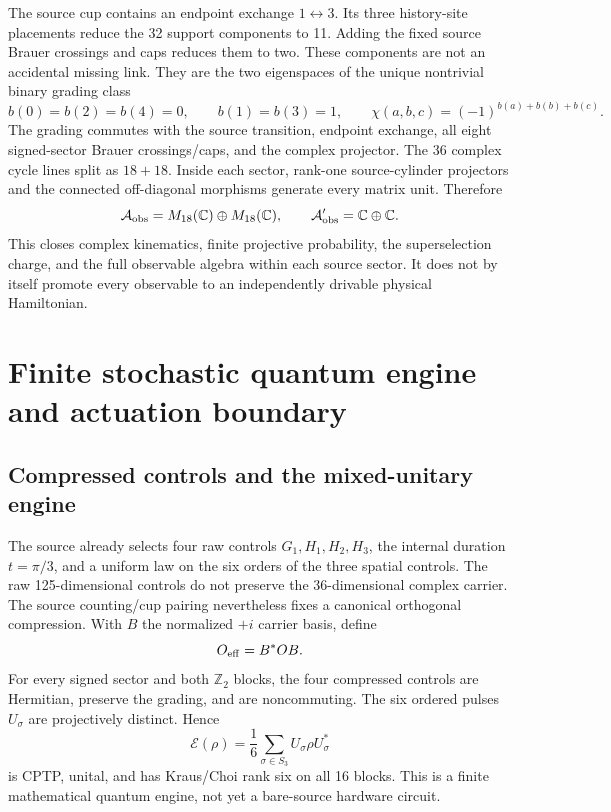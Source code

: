 \documentclass[11pt]{article}
\theoremstyle{definition}
\theoremstyle{remark}
\begin{document}
The source cup contains an endpoint exchange $1\leftrightarrow3$. Its three history-site placements reduce the 32 support components to 11. Adding the fixed source Brauer crossings and caps reduces them to two. These components are not an accidental missing link. They are the two eigenspaces of the unique nontrivial binary grading class
\begin{equation}
 b(0)=b(2)=b(4)=0,\qquad b(1)=b(3)=1,\qquad
 \chi(a,b,c)=(-1)^{b(a)+b(b)+b(c)}.
\end{equation}
The grading commutes with the source transition, endpoint exchange, all eight signed-sector Brauer crossings/caps, and the complex projector. The 36 complex cycle lines split as $18+18$. Inside each sector, rank-one source-cylinder projectors and the connected off-diagonal morphisms generate every matrix unit. Therefore
\begin{equation}
 \mathcal A_{\rm obs}
 =M_{18}(\mathbb C)\oplus M_{18}(\mathbb C),\qquad
 \mathcal A_{\rm obs}'=\mathbb C\oplus\mathbb C.
 \label{eq:obsalgebra091}
\end{equation}
This closes complex kinematics, finite projective probability, the superselection charge, and the full observable algebra within each source sector. It does not by itself promote every observable to an independently drivable physical Hamiltonian.

\section{Finite stochastic quantum engine and actuation boundary}\label{sec:engine091}

\subsection{Compressed controls and the mixed-unitary engine}

The source already selects four raw controls $G_1,H_1,H_2,H_3$, the internal duration $t=\pi/3$, and a uniform law on the six orders of the three spatial controls. The raw 125-dimensional controls do not preserve the 36-dimensional complex carrier. The source counting/cup pairing nevertheless fixes a canonical orthogonal compression. With $B$ the normalized $+i$ carrier basis, define
\begin{equation}
 O_{\rm eff}=B^*OB.
\end{equation}
For every signed sector and both $\mathbb Z_2$ blocks, the four compressed controls are Hermitian, preserve the grading, and are noncommuting. The six ordered pulses $U_\sigma$ are projectively distinct. Hence
\begin{equation}
 \mathcal E(\rho)=\frac16\sum_{\sigma\in S_3}U_\sigma\rho U_\sigma^*
 \label{eq:engine091}
\end{equation}
is CPTP, unital, and has Kraus/Choi rank six on all 16 blocks. This is a finite mathematical quantum engine, not yet a bare-source hardware circuit.
\end{document}
